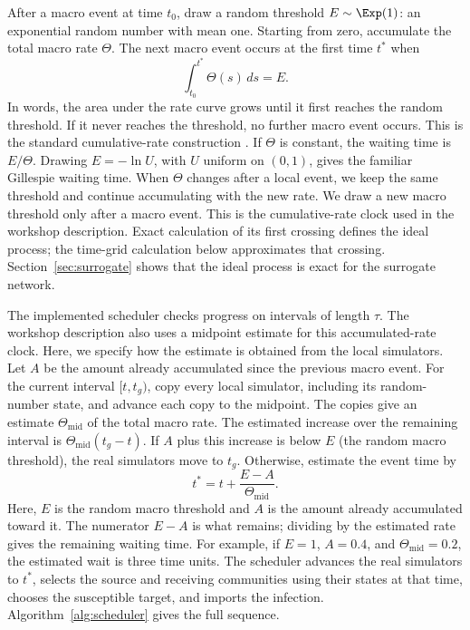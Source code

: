 After a macro event at time $t_0$, draw a random threshold $E\sim\Exp(1)$: an exponential random number with mean one. Starting from zero, accumulate the total macro rate $\Theta$. The next macro event occurs at the first time $t^\ast$ when
\begin{equation}
\label{eq:hazard_integral}
\int_{t_0}^{t^\ast}\Theta(s)\,ds=E.
\end{equation}
In words, the area under the rate curve grows until it first reaches the random threshold. If it never reaches the threshold, no further macro event occurs. This is the standard cumulative-rate construction \citep{ethier1986,anderson2007}. If $\Theta$ is constant, the waiting time is $E/\Theta$. Drawing $E=-\ln U$, with $U$ uniform on $(0,1)$, gives the familiar Gillespie waiting time. When $\Theta$ changes after a local event, we keep the same threshold and continue accumulating with the new rate. We draw a new macro threshold only after a macro event. This is the cumulative-rate clock used in the workshop description. Exact calculation of its first crossing defines the ideal process; the time-grid calculation below approximates that crossing. Section~\ref{sec:surrogate} shows that the ideal process is exact for the surrogate network.

The implemented scheduler checks progress on intervals of length $\tau$. The workshop description also uses a midpoint estimate for this accumulated-rate clock. Here, we specify how the estimate is obtained from the local simulators. Let $A$ be the amount already accumulated since the previous macro event. For the current interval $[t,t_g)$, copy every local simulator, including its random-number state, and advance each copy to the midpoint. The copies give an estimate $\Theta_{\mathrm{mid}}$ of the total macro rate. The estimated increase over the remaining interval is $\Theta_{\mathrm{mid}}(t_g-t)$. If $A$ plus this increase is below $E$ (the random macro threshold), the real simulators move to $t_g$. Otherwise, estimate the event time by
\begin{equation}
\label{eq:interpolation}
t^\ast=t+\frac{E-A}{\Theta_{\mathrm{mid}}}.
\end{equation}
Here, $E$ is the random macro threshold and $A$ is the amount already accumulated toward it. The numerator $E-A$ is what remains; dividing by the estimated rate gives the remaining waiting time. For example, if $E=1$, $A=0.4$, and $\Theta_{\mathrm{mid}}=0.2$, the estimated wait is three time units. The scheduler advances the real simulators to $t^\ast$, selects the source and receiving communities using their states at that time, chooses the susceptible target, and imports the infection. Algorithm~\ref{alg:scheduler} gives the full sequence.

